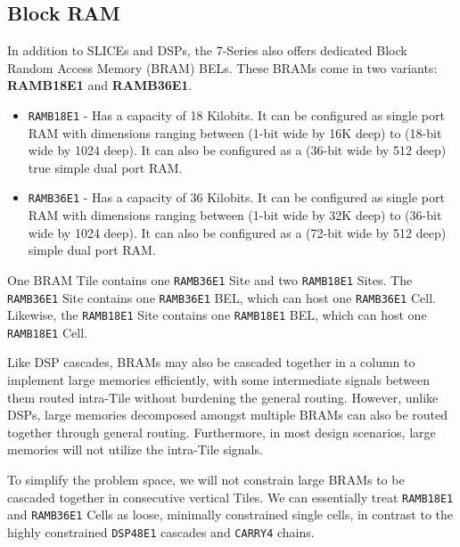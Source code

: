 \begin{multicols}{2}


\newpage

\subsection{Block RAM}
In addition to SLICEs and DSPs, the 7-Series also offers dedicated Block Random Access Memory (BRAM) BELs. 
These BRAMs come in two variants: \textbf{RAMB18E1} and \textbf{RAMB36E1}. 
\begin{itemize}
\item \texttt{RAMB18E1} - 
Has a capacity of 18 Kilobits. 
It can be configured as single port RAM with dimensions ranging between (1-bit wide by 16K deep) to (18-bit wide by 1024 deep). 
It can also be configured as a (36-bit wide by 512 deep) true simple dual port RAM. 
\item \texttt{RAMB36E1} - 
Has a capacity of 36 Kilobits. 
It can be configured as single port RAM with dimensions ranging between (1-bit wide by 32K deep) to (36-bit wide by 1024 deep). 
It can also be configured as a (72-bit wide by 512 deep) simple dual port RAM. 
\end{itemize}

One BRAM Tile contains one \texttt{RAMB36E1} Site and two \texttt{RAMB18E1} Sites. 
The \texttt{RAMB36E1} Site contains one \texttt{RAMB36E1} BEL, which can host one \texttt{RAMB36E1} Cell. 
Likewise, the \texttt{RAMB18E1} Site contains one \texttt{RAMB18E1} BEL, which can host one \texttt{RAMB18E1} Cell. 

Like DSP cascades, BRAMs may also be cascaded together in a column to implement large memories efficiently, with some intermediate signals between them routed intra-Tile without burdening the general routing. 
However, unlike DSPs, large memories decomposed amongst multiple BRAMs can also be routed together through general routing. 
Furthermore, in most design scenarios, large memories will not utilize the intra-Tile signals. 

To simplify the problem space, we will not constrain large BRAMs to be cascaded together in consecutive vertical Tiles. 
We can essentially treat \texttt{RAMB18E1} and \texttt{RAMB36E1} Cells as loose, minimally constrained single cells, in contrast to the highly constrained \texttt{DSP48E1} cascades and \texttt{CARRY4} chains.


\end{multicols}
